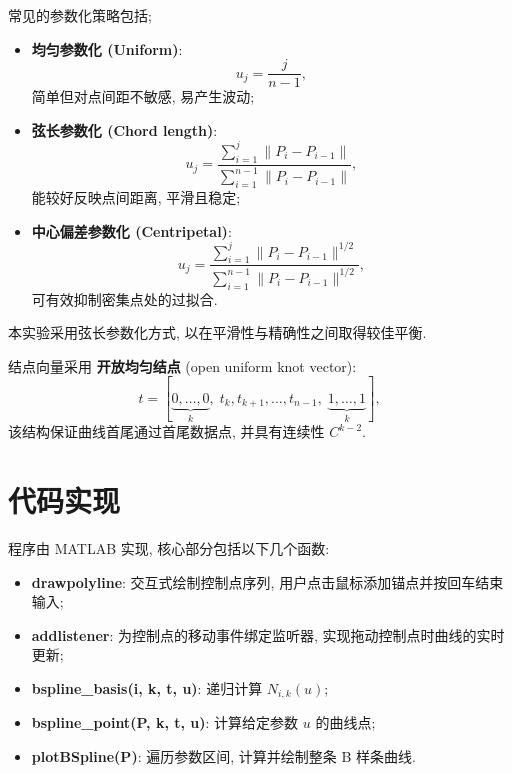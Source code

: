 \documentclass[12pt,a4paper]{article}
\begin{document}
            常见的参数化策略包括;
            \begin{itemize}
                \item \textbf{均匀参数化 (Uniform)}:
                    \begin{equation*}
                        u_j = \frac{j}{n-1},
                    \end{equation*}
                    简单但对点间距不敏感, 易产生波动;
                \item \textbf{弦长参数化 (Chord length)}:
                    \begin{equation*}
                        u_j =  \frac{\sum_{i=1}^{j} \|P_i - P_{i-1}\|}{\sum_{i=1}^{n-1} \|P_i - P_{i-1}\|},
                    \end{equation*}
                    能较好反映点间距离, 平滑且稳定;
                \item \textbf{中心偏差参数化 (Centripetal)}:
                    \begin{equation*}
                        u_j = \frac{\sum_{i=1}^{j} \|P_i - P_{i-1}\|^{1/2}}{\sum_{i=1}^{n-1} \|P_i - P_{i-1}\|^{1/2}},
                    \end{equation*}
                    可有效抑制密集点处的过拟合.
            \end{itemize}

            本实验采用弦长参数化方式, 以在平滑性与精确性之间取得较佳平衡.

            结点向量采用 \textbf{开放均匀结点} (open uniform knot vector):
            \begin{equation*}
                t = [\underbrace{0, \dots, 0}_{k}, \; t_k, t_{k+1}, \dots, t_{n-1}, \; \underbrace{1, \dots, 1}_{k}],
            \end{equation*}
            该结构保证曲线首尾通过首尾数据点, 并具有连续性 $C^{k-2}$.

    \section{代码实现}
        程序由 MATLAB 实现, 核心部分包括以下几个函数:

        \begin{itemize}
            \item \textbf{drawpolyline}: 交互式绘制控制点序列, 用户点击鼠标添加锚点并按回车结束输入;
            \item \textbf{addlistener}: 为控制点的移动事件绑定监听器, 实现拖动控制点时曲线的实时更新;
            \item \textbf{bspline\_basis(i, k, t, u)}: 递归计算 $N_{i,k}(u)$;
            \item \textbf{bspline\_point(P, k, t, u)}: 计算给定参数 $u$ 的曲线点;
            \item \textbf{plotBSpline(P)}: 遍历参数区间, 计算并绘制整条 B 样条曲线.
        \end{itemize}
\end{document}
